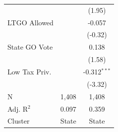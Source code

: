 \begin{tabular*}{\textwidth}{@{\extracolsep{\fill}}lcc}
                               &              & (1.95)\\   
   LTGO Allowed                &              & -0.057\\   
                               &              & (-0.32)\\   
   State GO Vote               &              & 0.138\\   
                               &              & (1.58)\\   
   Low Tax Priv.               &              & -0.312$^{***}$\\   
                               &              & (-3.32)\\   
   \hline
   N                & 1,408        & 1,408\\  
   Adj. R$^2$              & 0.097        & 0.359\\  
   Cluster              & State & State\\  
   \bottomrule
\end{tabular*}
\par\endgroup
